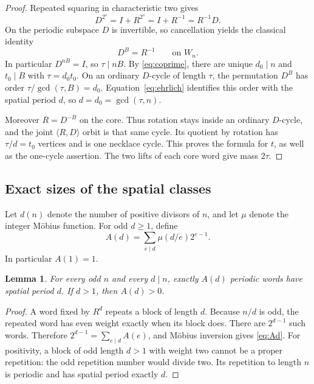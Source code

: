 \documentclass[11pt]{article}
\newtheorem{lemma}[theorem]{Lemma}
\theoremstyle{definition}
\theoremstyle{remark}
\numberwithin{equation}{section}
\begin{document}
\begin{proof}
Repeated squaring in characteristic two gives
\[
 D^{2^s}=I+R^{2^s}=I+R^{-1}=R^{-1}D.
\]
On the periodic subspace $D$ is invertible, so cancellation yields the
classical identity
\begin{equation}\label{eq:ehrlich}
 D^B=R^{-1}\qquad\text{on }W_n.
\end{equation}
In particular $D^{nB}=I$, so $\tau\mid nB$. By \eqref{eq:coprime},
there are unique $d_0\mid n$ and $t_0\mid B$ with $\tau=d_0t_0$.
On an ordinary $D$-cycle of length $\tau$, the permutation $D^B$ has
order $\tau/\gcd(\tau,B)=d_0$. Equation~\eqref{eq:ehrlich} identifies
this order with the spatial period $d$, so
$d=d_0=\gcd(\tau,n)$.

Moreover $R=D^{-B}$ on the core. Thus rotation stays inside an ordinary
$D$-cycle, and the joint $\langle R,D\rangle$ orbit is that same cycle.
Its quotient by rotation has $\tau/d=t_0$ vertices and is one necklace
cycle. This proves the formula for $t$, as well as the one-cycle assertion.
The two lifts of each core word give mass $2\tau$.
\end{proof}

\subsection{Exact sizes of the spatial classes}

Let $d(n)$ denote the number of positive divisors of $n$, and let $\mu$
denote the integer M\"obius function. For odd $d\ge1$, define
\begin{equation}\label{eq:Ad}
 A(d)=\sum_{e\mid d}\mu(d/e)2^{e-1}.
\end{equation}
In particular $A(1)=1$.

\begin{lemma}\label{lem:spatial-count}
For every odd $n$ and every $d\mid n$, exactly $A(d)$ periodic words
have spatial period $d$. If $d>1$, then $A(d)>0$.
\end{lemma}

\begin{proof}
A word fixed by $R^d$ repeats a block of length $d$. Because $n/d$ is
odd, the repeated word has even weight exactly when its block does.
There are $2^{d-1}$ such words. Therefore
$2^{d-1}=\sum_{e\mid d}A(e)$, and M\"obius inversion gives
\eqref{eq:Ad}. For positivity, a block of odd length $d>1$ with weight
two cannot be a proper repetition: the odd repetition number would
divide two. Its repetition to length $n$ is periodic and has spatial
period exactly $d$.
\end{proof}
\end{document}
